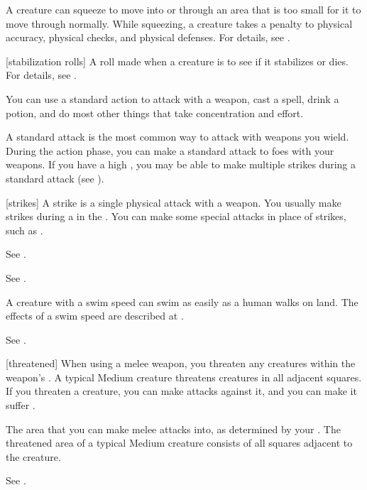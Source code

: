  A creature can squeeze to move into or through an area that is too small for it to move through normally.
While squeezing, a creature takes a  penalty to physical accuracy, physical checks, and physical defenses.
For details, see .

[stabilization rolls] A roll made when a creature is  to see if it stabilizes or dies. For details, see .

 You can use a standard action to attack with a weapon, cast a spell, drink a potion, and do most other things that take concentration and effort.

 A standard attack is the most common way to attack with weapons you wield.
During the action phase, you can make a standard attack to  foes with your weapons.
If you have a high , you may be able to make multiple strikes during a standard attack (see ).

[strikes] A strike is a single physical attack with a weapon.
You usually make strikes during a  in the .
You can make some special attacks in place of strikes, such as .

 See .

 See .

 A creature with a swim speed can swim as easily as a human walks on land.
The effects of a swim speed are described at .

 See .

[threatened] When using a melee weapon, you threaten any creatures within the weapon's .
A typical Medium creature threatens creatures in all adjacent squares.
If you threaten a creature, you can make  attacks against it, and you can make it suffer .

 The area that you can make melee attacks into, as determined by your .
The threatened area of a typical Medium creature consists of all squares adjacent to the creature.

 See .

